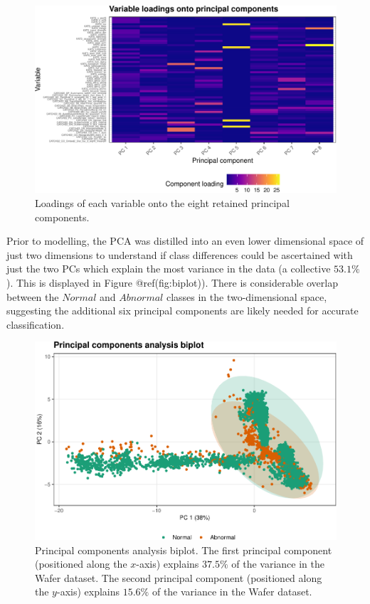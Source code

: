 \documentclass{article}
\begin{document}
\begin{figure}
\centering
\includegraphics{olet5610_report_files/figure-latex/loadplot-1.pdf}
\caption{Loadings of each variable onto the eight retained principal
components.}
\end{figure}

Prior to modelling, the PCA was distilled into an even lower dimensional
space of just two dimensions to understand if class differences could be
ascertained with just the two PCs which explain the most variance in the
data (a collective \(53.1\%\)). This is displayed in Figure
@ref(fig:biplot)). There is considerable overlap between the \(Normal\)
and \(Abnormal\) classes in the two-dimensional space, suggesting the
additional six principal components are likely needed for accurate
classification.

\begin{figure}
\centering
\includegraphics{olet5610_report_files/figure-latex/biplot-1.pdf}
\caption{Principal components analysis biplot. The first principal
component (positioned along the \(x\)-axis) explains \(37.5\%\) of the
variance in the Wafer dataset. The second principal component
(positioned along the \(y\)-axis) explains \(15.6\%\) of the variance in
the Wafer dataset.}
\end{figure}
\end{document}
